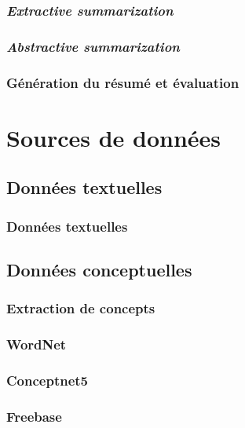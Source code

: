 \documentclass[12pt]{beamer}
\begin{document}
\begin{frame}
 \frametitle{\textit{Extractive summarization}}
 
 
\end{frame}

\begin{frame}
 \frametitle{\textit{Abstractive summarization}}
 
 
\end{frame}


\begin{frame}
 \frametitle{Génération du résumé et évaluation}
 
 
\end{frame}


\section{Sources de données}

\subsection{Données textuelles}

\begin{frame}
 \frametitle{Données textuelles}
 
 
\end{frame}

\subsection{Données conceptuelles}

\begin{frame}
 \frametitle{Extraction de concepts}
 
 
\end{frame}

\begin{frame}
 \frametitle{WordNet}
 
 
\end{frame}

\begin{frame}
 \frametitle{Conceptnet5}
 
 
\end{frame}

\begin{frame}
 \frametitle{Freebase}
 
 
\end{frame}
\end{document}
